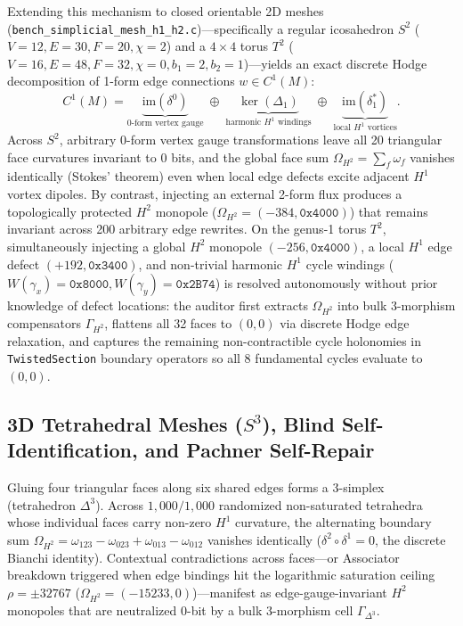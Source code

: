 \documentclass[11pt, a4paper]{article}
\begin{document}
Extending this mechanism to closed orientable 2D meshes (\texttt{bench\_simplicial\_mesh\_h1\_h2.c})---specifically a regular icosahedron $S^2$ ($V=12, E=30, F=20, \chi=2$) and a $4 \times 4$ torus $T^2$ ($V=16, E=48, F=32, \chi=0, b_1=2, b_2=1$)---yields an exact discrete Hodge decomposition of 1-form edge connections $w \in C^1(M)$:
\begin{equation}
    C^1(M) = \underbrace{\mathrm{im}(\delta^0)}_{\text{0-form vertex gauge}} \;\oplus\; \underbrace{\ker(\Delta_1)}_{\text{harmonic } H^1 \text{ windings}} \;\oplus\; \underbrace{\mathrm{im}(\delta_1^*)}_{\text{local } H^1 \text{ vortices}}.
\end{equation}
Across $S^2$, arbitrary 0-form vertex gauge transformations leave all 20 triangular face curvatures invariant to 0 bits, and the global face sum $\Omega_{H^2} = \sum_{f} \omega_f$ vanishes identically (Stokes' theorem) even when local edge defects excite adjacent $H^1$ vortex dipoles. By contrast, injecting an external 2-form flux produces a topologically protected $H^2$ monopole ($\Omega_{H^2} = (-384, \texttt{0x4000})$) that remains invariant across 200 arbitrary edge rewrites. On the genus-1 torus $T^2$, simultaneously injecting a global $H^2$ monopole $(-256, \texttt{0x4000})$, a local $H^1$ edge defect $(+192, \texttt{0x3400})$, and non-trivial harmonic $H^1$ cycle windings ($W(\gamma_x) = \texttt{0x8000}, W(\gamma_y) = \texttt{0x2B74}$) is resolved autonomously without prior knowledge of defect locations: the auditor first extracts $\Omega_{H^2}$ into bulk 3-morphism compensators $\Gamma_{H^2}$, flattens all 32 faces to $(0,0)$ via discrete Hodge edge relaxation, and captures the remaining non-contractible cycle holonomies in \texttt{TwistedSection} boundary operators so all 8 fundamental cycles evaluate to $(0,0)$.

\subsection{3D Tetrahedral Meshes ($S^3$), Blind Self-Identification, and Pachner Self-Repair}
Gluing four triangular faces along six shared edges forms a 3-simplex (tetrahedron $\Delta^3$). Across $1,000/1,000$ randomized non-saturated tetrahedra whose individual faces carry non-zero $H^1$ curvature, the alternating boundary sum $\Omega_{H^2} = \omega_{123} - \omega_{023} + \omega_{013} - \omega_{012}$ vanishes identically ($\delta^2 \circ \delta^1 = 0$, the discrete Bianchi identity). Contextual contradictions across faces---or Associator breakdown triggered when edge bindings hit the logarithmic saturation ceiling $\rho = \pm 32767$ ($\Omega_{H^2} = (-15233, 0)$)---manifest as edge-gauge-invariant $H^2$ monopoles that are neutralized 0-bit by a bulk 3-morphism cell $\Gamma_{\Delta^3}$.
\end{document}
